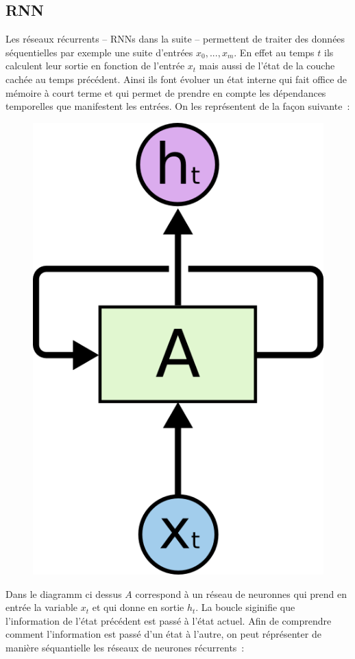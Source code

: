 \documentclass[11pt]{scrartcl} %
\begin{document}
\subsection{RNN}
Les réseaux récurrents – RNNs dans la suite – permettent de traiter des données séquentielles par exemple une suite d’entrées $x_0, . . . ,x_m$. En effet au temps $t$ ils calculent leur sortie en fonction de l’entrée $x_t$ mais aussi de l’état de la couche cachée au temps précédent. Ainsi ils font évoluer un état interne qui fait office de mémoire à court terme et qui permet de prendre en compte les dépendances temporelles que manifestent les entrées. On les représentent de la façon suivante~:

\begin{figure}[h]
	\begin{center}
		\includegraphics[scale=.3]{RNN-rolled.png}
	\end{center}
\end{figure}
Dans le diagramm ci dessus $A$ correspond à un réseau de neuronnes qui prend en entrée la variable $x_t$ et qui donne en sortie $h_t$. La boucle siginifie que l'information de l'état précédent est passé à l'état actuel. Afin de comprendre comment l'information est passé d'un état à l'autre, on peut réprésenter de manière séquantielle les réseaux de neurones récurrents~: 
\end{document}
